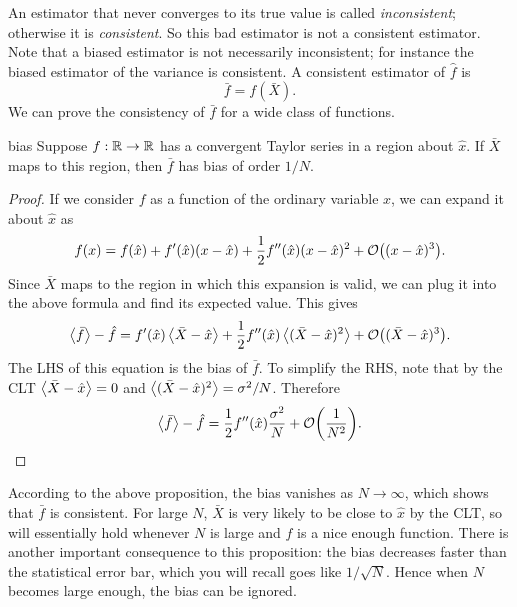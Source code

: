 An estimator that never converges to its true value is called
{\it inconsistent}; otherwise it is {\it consistent}.
So this bad estimator is not a consistent estimator. Note that a biased
estimator is not necessarily inconsistent; for instance the biased estimator
of the variance  is consistent. A consistent estimator
of $\hat{f}$ is
\begin{equation}\label{eq:consistentEstimator}
  \bar{f}=f(\bar{X}).
\end{equation} 
We can prove the consistency of $\bar{f}$ for a wide class of functions.
\begin{proposition}{}{bias}
  Suppose $f:\mathbb{R}\to\mathbb{R}$ has a convergent Taylor series 
  in a region about $\hat{x}$. If $\bar{X}$ maps to this region, 
  then $\bar{f}$ has bias of order $1/N$.
  \begin{proof}
    If we consider $f$ as a function of the ordinary variable $x$, we can
    expand it about $\hat{x}$ as
    $$
      f(x)=f(\hat{x})+f'(\hat{x})(x-\hat{x})
           +\frac{1}{2}f''(\hat{x})(x-\hat{x})^2
           +\order{(x-\hat{x})^3}.
    $$
    Since $\bar{X}$ maps to the region in which this expansion is valid,
    we can plug it into the above formula and find its expected value.
    This gives
    $$
      \ev{\bar{f}}-\hat{f}=f'(\hat{x})\ev{\bar{X}-\hat{x}}
           +\frac{1}{2}f''(\hat{x})\ev{(\bar{X}-\hat{x})^2}
           +\order{(\bar{X}-\hat{x})^3}.
    $$
    The LHS of this equation is the bias of $\bar{f}$. To simplify the
    RHS, note that by the CLT $\ev{\bar{X}-\hat{x}}=0$ and
    $\ev{(\bar{X}-\hat{x})^2}=\sigma^2/N$. Therefore
    $$
      \ev{\bar{f}}-\hat{f}=\frac{1}{2}f''(\hat{x})\frac{\sigma^2}{N}
                           +\order{\frac{1}{N^2}}.
    $$
  \end{proof}
\end{proposition}
According to the above proposition, the bias vanishes as $N\to\infty$, which
shows that $\bar{f}$ is consistent. For large $N$, $\bar{X}$ is very likely
to be close to $\hat{x}$ by the CLT, so  will 
essentially hold whenever $N$ is large and $f$ is a nice enough function.
There is another important consequence to this proposition: the bias
decreases faster than the statistical error bar, which you will recall
goes like $1/\sqrt{N}$. Hence when $N$ becomes large enough, the bias
can be ignored.

